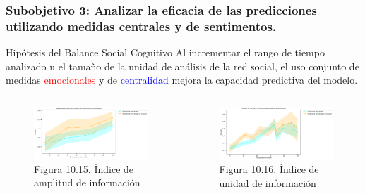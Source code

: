 \documentclass{beamer}
\begin{document}
\begin{frame}
	\frametitle{Subobjetivo 3: Analizar la eficacia de las predicciones utilizando medidas centrales y de sentimentos.}
	\begin{block}{Hipótesis del Balance Social Cognitivo}
Al incrementar el rango de tiempo analizado u el tamaño de la unidad de análisis de la red social, el uso conjunto de medidas \textcolor{red}{emocionales} y de \textcolor{blue}{centralidad} mejora la capacidad predictiva del modelo.

	\end{block}
			\begin{columns}[c]
		\begin{column}{.5\textwidth}
			\begin{figure}
				\centering
				\includegraphics[width=1\textwidth]{figs/cap7/figura_53}
\caption{Figura 10.15. Índice de amplitud de información}
			\end{figure}      
		\end{column}
		\begin{column}{.5\textwidth}
			\begin{figure}
				\centering
\includegraphics[width=1\textwidth]{figs/cap7/figura_54}
\caption{Figura 10.16. Índice de unidad de información}
			\end{figure}
		\end{column}
	\end{columns}
	
\end{frame}
\end{document}
